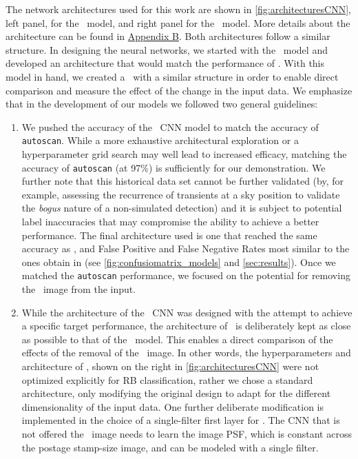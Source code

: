 The network architectures used for this work are shown in  \autoref{fig:architecturesCNN}, left panel, for the \diabased\ model, and right  panel for the \nodia\ model. More details about the architecture can be found in \hyperref[sec:appendixb]{Appendix B}. Both architectures follow a similar structure. In designing the neural networks, we started with the \diabased\ model and developed an architecture that would match the performance of \citet{Goldstein_2015}.  With this model in hand, we created a \nodia\ with a similar structure in order to enable direct comparison and measure the effect of the change in the input data. 
We emphasize that in the development of our models we followed two general guidelines: 
\begin{enumerate}
\item We pushed the accuracy of the  \diabased\ CNN model to match the accuracy of \texttt{autoscan}. While a more exhaustive architectural exploration or a hyperparameter grid search may well lead to increased efficacy, matching the accuracy of \texttt{autoscan} (at 97\%) is sufficiently for our demonstration. We further note that this historical data set cannot be further validated (by, for example, assessing the recurrence of transients at a sky position to validate the {\it bogus} nature of a non-simulated detection) and it is subject to potential label inaccuracies that may compromise the ability to achieve a better performance. The final architecture used is one that reached the same accuracy as \citet{Goldstein_2015}, and  False Positive and False Negative Rates most similar to the ones obtain in \citet{Goldstein_2015}  (see \autoref{fig:confusiomatrix_models} and \autoref{sec:results}). Once we matched the \texttt{autoscan} performance, we focused on the potential for removing the \diff\ image from the input.
\item While the architecture of the \diabased\ CNN was designed with the attempt to achieve a specific target performance, the architecture of \nodia\ is deliberately kept as close as possible to that of the \diabased\ model. This enables a direct comparison of the effects of the removal of the \diff\ image. 
In other words, the hyperparameters and architecture of \nodia, shown on the right in \autoref{fig:architecturesCNN} were not optimized explicitly for RB classification, rather we chose a standard architecture, only modifying the original design to adapt for the different dimensionality of the input data. One further deliberate modification is implemented in the choice of a single-filter first layer for \nodia. The CNN that is not offered the \diff\ image needs to learn the image PSF, which is constant across the postage stamp-size image, and can be modeled with a single filter. 
\end{enumerate}



